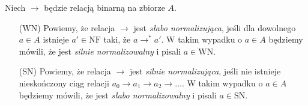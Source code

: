 \begin{definicja}
  Niech \(\to\) będzie relacją binarną na zbiorze \(A\). 
\begin{enumerate}
  \setlength\itemsep{0em}
  \item[(WN) ] Powiemy, że relacja \(\to\) jest \emph{słabo normalizująca}, jeśli
    dla dowolnego \(a\in A\) istnieje \(a'\in \mathrm{NF}\) taki, że \(a\to^{*} a'\). W takim wypadku o \(a\in A\) będziemy mówili, że jest \emph{silnie normalizowalny} i pisali \(a\in \mathrm{WN}\).
  \item[(SN)] Powiemy, że relacja \(\to\) jest \emph{silnie normalizująca}, jeśli nie istnieje nieskończony ciąg relacji \(a_0 \to a_1 \to a_2 \to \dots\). W takim wypadku o \(a\in A\) będziemy mówili, że jest \emph{słabo normalizowalny} i pisali \(a\in \mathrm{SN}\).

\end{enumerate}
\end{definicja}

